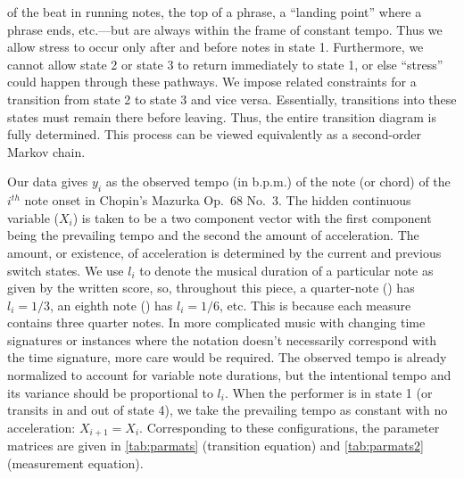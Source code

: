 \documentclass[12pt]{article}
\begin{document}
of the beat in running notes, the top of a
phrase, a ``landing point'' where a phrase ends, etc.---but are always
within the frame of constant tempo. Thus we allow stress to occur only
after and before notes in state 1. Furthermore, we cannot allow
state 2 or state 3 to return immediately to state 1, or else ``stress'' could
happen through these pathways. We impose related constraints for a transition from state 2
to state 3 and vice versa. Essentially, transitions into these states must remain
there before leaving. Thus, the entire transition diagram is
fully determined. This process can  be viewed equivalently as a
second-order Markov chain.


Our data gives $y_i$ as the observed tempo (in b.p.m.) of the note (or
chord) of the $i^{th}$ note onset in Chopin's Mazurka Op.\ 68 No.\ 3. The
hidden continuous variable ($X_i$) is 
taken to be a two component vector with the first component being the
prevailing tempo and the second the amount of acceleration. The amount, or
existence, of acceleration is determined by the current and previous
switch states. We use $l_i$ to denote the musical duration of
a particular note as given by the written score, so, throughout this piece, a quarter-note (\quarternote) has $l_i=1/3$, an
eighth note (\eighthnote) has $l_i=1/6$, etc. This is because each
measure contains three quarter notes. In more complicated
music with changing time signatures or instances where the notation
doesn't necessarily correspond with the time signature, more care
would be required. The observed tempo is already normalized to account
for variable note durations, but the intentional tempo and its
variance should be proportional to $l_i$. When the performer is in state 1 (or
transits in and out of state 4), we take the prevailing tempo as
constant with no acceleration: $X_{i+1} = X_i$. 
Corresponding to these configurations, the parameter
matrices are given in \autoref{tab:parmats} (transition equation) and
\autoref{tab:parmats2} (measurement equation).
\end{document}

